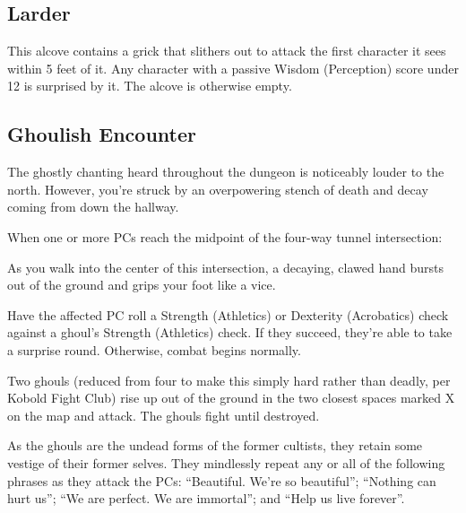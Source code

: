 \begin{arealinks}
\end{arealinks}


\pagebreak
\subsection{Larder}
\label{sec:Larder}
This alcove contains a grick that slithers out to attack the first character it sees within 5 feet of it.
Any character with a passive Wisdom (Perception) score under 12 is surprised by it. The alcove is otherwise
empty.

\begin{arealinks}
\end{arealinks}


\pagebreak
\subsection{Ghoulish Encounter}
\label{sec:GhoulishEncounter}
\begin{readout}
  The ghostly chanting heard throughout the dungeon is noticeably louder to the north. However, you're struck
  by an overpowering stench of death and decay coming from down the hallway.
\end{readout}
When one or more PCs reach the midpoint of the four-way tunnel intersection:
\begin{readout}
  As you walk into the center of this intersection, a decaying, clawed hand bursts out of the ground and
  grips your foot like a vice.
\end{readout}
Have the affected PC roll a Strength (Athletics) or Dexterity (Acrobatics) check against a ghoul's Strength
(Athletics) check. If they succeed, they're able to take a surprise round. Otherwise, combat begins normally.

Two ghouls (reduced from four to make this simply hard rather than deadly, per Kobold Fight Club) rise up
out of the ground in the two closest spaces marked X on the map and attack. The ghouls fight until destroyed.

As the ghouls are the undead forms of the former cultists, they retain some vestige of their former selves.
They mindlessly repeat any or all of the following phrases as they attack the PCs: ``Beautiful. We're so
beautiful''; ``Nothing can hurt us''; ``We are perfect. We are immortal''; and ``Help us live forever''.

